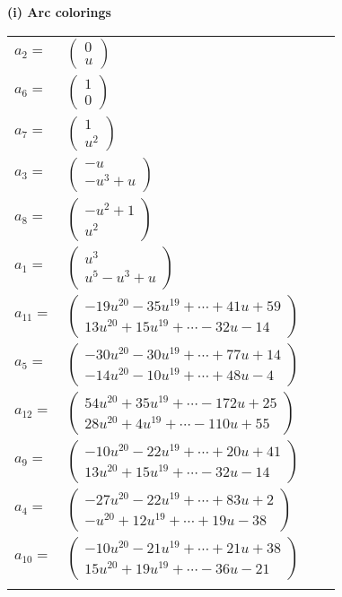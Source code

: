 \documentclass[1p]{elsarticle_modified}
\theoremstyle{definition}
\begin{document}
\flushleft \textbf{(i) Arc colorings}\\
\begin{tabular}{m{7pt} m{180pt} m{7pt} m{180pt} }
\flushright $a_{2}=$&$\begin{pmatrix}0\\u\end{pmatrix}$ \\
\flushright $a_{6}=$&$\begin{pmatrix}1\\0\end{pmatrix}$ \\
\flushright $a_{7}=$&$\begin{pmatrix}1\\u^2\end{pmatrix}$ \\
\flushright $a_{3}=$&$\begin{pmatrix}- u\\- u^3+u\end{pmatrix}$ \\
\flushright $a_{8}=$&$\begin{pmatrix}- u^2+1\\u^2\end{pmatrix}$ \\
\flushright $a_{1}=$&$\begin{pmatrix}u^3\\u^5- u^3+u\end{pmatrix}$ \\
\flushright $a_{11}=$&$\begin{pmatrix}-19 u^{20}-35 u^{19}+\cdots+41 u+59\\13 u^{20}+15 u^{19}+\cdots-32 u-14\end{pmatrix}$ \\
\flushright $a_{5}=$&$\begin{pmatrix}-30 u^{20}-30 u^{19}+\cdots+77 u+14\\-14 u^{20}-10 u^{19}+\cdots+48 u-4\end{pmatrix}$ \\
\flushright $a_{12}=$&$\begin{pmatrix}54 u^{20}+35 u^{19}+\cdots-172 u+25\\28 u^{20}+4 u^{19}+\cdots-110 u+55\end{pmatrix}$ \\
\flushright $a_{9}=$&$\begin{pmatrix}-10 u^{20}-22 u^{19}+\cdots+20 u+41\\13 u^{20}+15 u^{19}+\cdots-32 u-14\end{pmatrix}$ \\
\flushright $a_{4}=$&$\begin{pmatrix}-27 u^{20}-22 u^{19}+\cdots+83 u+2\\- u^{20}+12 u^{19}+\cdots+19 u-38\end{pmatrix}$ \\
\flushright $a_{10}=$&$\begin{pmatrix}-10 u^{20}-21 u^{19}+\cdots+21 u+38\\15 u^{20}+19 u^{19}+\cdots-36 u-21\end{pmatrix}$\\&\end{tabular}
\end{document}
